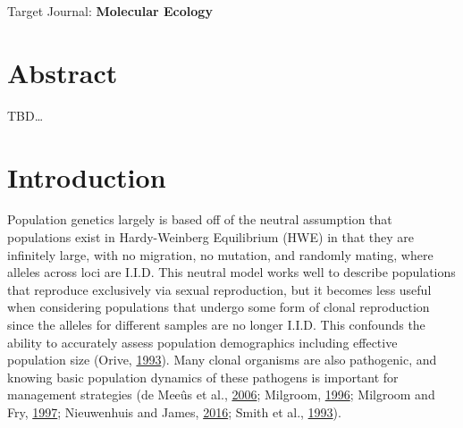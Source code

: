 \documentclass[double,12pt]{beavtex}
\begin{document}
  Target Journal: \textbf{Molecular Ecology}
  
  \doublespacing
  \newpage
  
  \section{Abstract}\label{abstract-4}
  
  TBD\ldots{}
  
  \section{Introduction}\label{introduction-4}
  
  Population genetics largely is based off of the neutral assumption that
  populations exist in Hardy-Weinberg Equilibrium (HWE) in that they are
  infinitely large, with no migration, no mutation, and randomly mating,
  where alleles across loci are I.I.D. This neutral model works well to
  describe populations that reproduce exclusively via sexual reproduction,
  but it becomes less useful when considering populations that undergo
  some form of clonal reproduction since the alleles for different samples
  are no longer I.I.D. This confounds the ability to accurately assess
  population demographics including effective population size (Orive,
  \protect\hyperlink{ref-orive1993effective}{1993}). Many clonal organisms
  are also pathogenic, and knowing basic population dynamics of these
  pathogens is important for management strategies (de Meeûs et al.,
  \protect\hyperlink{ref-de2006molecular}{2006}; Milgroom,
  \protect\hyperlink{ref-milgroom1996recombination}{1996}; Milgroom and
  Fry, \protect\hyperlink{ref-milgroom1997contributions}{1997};
  Nieuwenhuis and James,
  \protect\hyperlink{ref-nieuwenhuis2016frequency}{2016}; Smith et al.,
  \protect\hyperlink{ref-smith1993how}{1993}).
  
\end{document}
